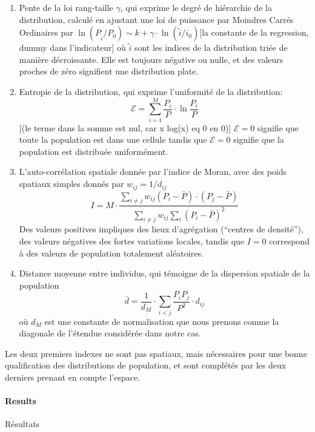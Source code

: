 {\begin{enumerate}
\item Pente de la loi rang-taille $\gamma$, qui exprime le degré de hiérarchie de la distribution, calculé en ajustant une loi de puissance par Moindres Carrés Ordinaires par $\ln \left( P_{\tilde{i}}/P_0\right) \sim k + \gamma\cdot \ln \left(\tilde{i}/i_0\right)$[la constante de la regression, dummy dans l'indicateur] où $\tilde{i}$ sont les indices de la distribution triée de manière décroissante. Elle est toujours négative ou nulle, et des valeurs proches de zéro signifient une distribution plate.
\item Entropie de la distribution, qui exprime l'uniformité de la distribution:
\begin{equation}
\mathcal{E} = \sum_{i=1}^{M}\frac{P_i}{P}\cdot \ln{\frac{P_i}{P}}
\end{equation}
[(le terme dans la somme est nul, car x log(x) eq 0 en 0)]
$\mathcal{E}=0$ signifie que toute la population est dans une cellule tandis que $\mathcal{E}=0$ signifie que la population est distribuée uniformément.
\item L'auto-corrélation spatiale donnée par l'indice de Moran, avec des poids spatiaux simples donnés par $w_{ij} = 1/d_{ij}$
\[
I = M \cdot \frac{\sum_{i\neq j} w_{ij} \left(P_i - \bar{P}\right)\cdot\left(P_j - \bar{P}\right)}{\sum_{i\neq j} w_{ij} \sum_{i}{\left( P_i - \bar{P}\right)}^2}
\]
Des valeurs positives impliques des lieux d'agrégation (``centres de densité''), des valeurs négatives des fortes variations locales, tandis que $I=0$ correspond à des valeurs de population totalement aléatoires.
\item Distance moyenne entre individus, qui témoigne de la dispersion spatiale de la population
\[
\bar{d} = \frac{1}{d_M}\cdot \sum_{i<j} \frac{P_i P_j}{P^2} \cdot d_{ij}
\]
où $d_M$ est une constante de normalisation que nous prenons comme la diagonale de l'étendue considérée dans notre cas.
\end{enumerate}
}

Les deux premiers indexes ne sont pas spatiaux, mais nécessaires pour une bonne qualification des distributions de population, et sont complétés par les deux derniers prenant en compte l'espace.


\paragraph{Results}{Résultats}




